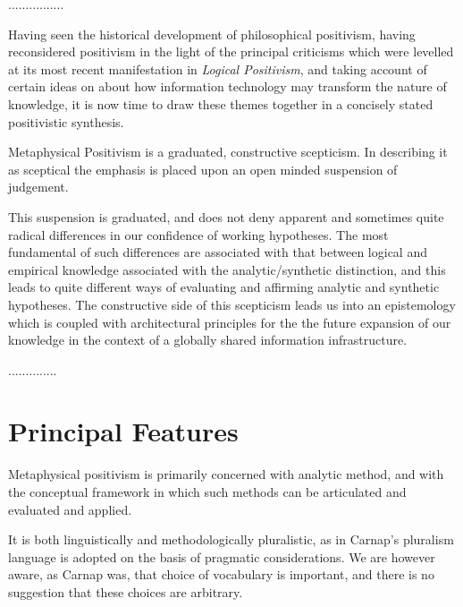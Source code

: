 ................


Having seen the historical development of philosophical positivism,
having reconsidered positivism in the light of the principal
criticisms which were levelled at its most recent manifestation in
\emph{Logical Positivism}, and taking account of certain ideas on
about how information technology may transform the nature of
knowledge, it is now time to draw these themes together in a concisely
stated positivistic synthesis.

Metaphysical Positivism is a graduated, constructive scepticism.
In describing it as sceptical the emphasis is placed upon an open
minded suspension of judgement.

This suspension is graduated, and does not deny apparent and
sometimes quite radical differences in our confidence of working
hypotheses.
The most fundamental of such differences are associated with that
between logical and empirical knowledge associated with the
analytic/synthetic distinction, and this leads to quite different ways
of evaluating and affirming analytic and synthetic hypotheses.
The constructive side of this scepticism leads us into an epistemology
which is coupled with architectural principles for the the future
expansion of our knowledge in the context of a globally shared
information infrastructure.

..............

\section{Principal Features}

Metaphysical positivism is primarily concerned with analytic method,
and with the conceptual framework in which such methods can be
articulated and evaluated and applied.

It is both linguistically and methodologically pluralistic, as in
Carnap's pluralism language is adopted on the basis of pragmatic
considerations.
We are however aware, as Carnap was, that choice of vocabulary is
important, and there is no suggestion that these choices are
arbitrary.

 
